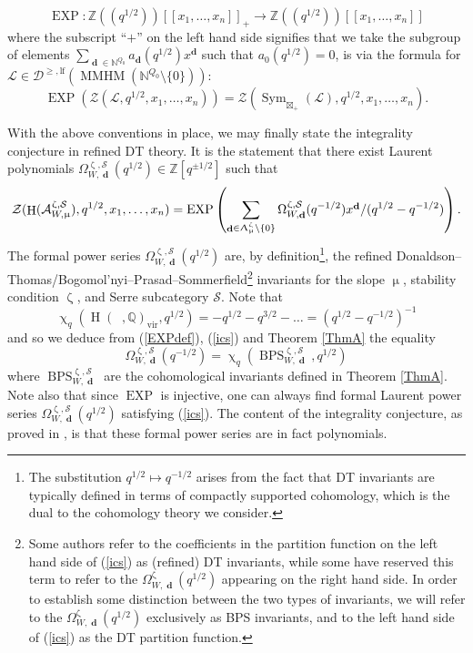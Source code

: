\documentclass[a4paper,10pt]{amsart}
\renewcommand{\zeta}{\upzeta}
\renewcommand{\chi}{\upchi}
\renewcommand{\Lambda}{\Uplambda}
\renewcommand{\mu}{\upmu}
\DeclareMathOperator{\BC}{B\mathbb{C}^*}
\DeclareMathOperator{\EXP}{EXP}
\newcommand{\SP}{\mathcal{S}}
\DeclareMathOperator{\MMHM}{MMHM}
\DeclareMathOperator{\dd}{\mathbf{d}}
\DeclareMathOperator{\DT}{BPS}
\DeclareMathOperator{\Sym}{Sym}
\DeclareMathOperator{\vir}{vir}
\DeclareMathOperator{\HO}{H}
\newcommand{\Dulf}{\mathcal{D}^{\geq, \mathrm{lf}}}
\begin{document}
\[
\EXP\colon\mathbb{Z}((q^{1/2}))[[x_1,\ldots,x_n]]_+\rightarrow\mathbb{Z}((q^{1/2}))[[x_1,\ldots,x_n]]
\]
where the subscript ``$+$'' on the left hand side signifies that we take the subgroup of elements $\sum_{\dd\in\mathbb{N}^{Q_0}}a_{\dd}(q^{1/2})x^{\dd}$ such that $a_0(q^{1/2})=0$, is via the formula for $\mathcal{L}\in\Dulf(\MMHM(\mathbb{N}^{Q_0}\setminus\{0\}))$:
\begin{equation}
\label{EXPdef}
\EXP\left(\mathcal{Z}(\mathcal{L},q^{1/2},x_1,\ldots,x_n)\right)=\mathcal{Z}\left(\Sym_{\boxtimes_+}(\mathcal{L}),q^{1/2},x_1,\ldots,x_n\right).
\end{equation}


With the above conventions in place, we may finally state the integrality conjecture in refined DT theory.  It is the statement that there exist Laurent polynomials $\Omega^{\zeta,\SP}_{W,\dd}(q^{1/2})\in\mathbb{Z}[q^{\pm 1/2}]$ such that 
\begin{equation}
\label{ics}
\mathcal{Z}(\HO(\mathcal{A}_{W,\mu}^{\zeta,\SP}),q^{1/2},x_1,\ldots,x_n)=\EXP\left(\sum_{\dd\in\Lambda_{\mu}^{\zeta}\setminus\{0\}} \Omega^{\zeta,\SP}_{W,\dd}(q^{-1/2})x^{\dd}/(q^{1/2}-q^{-1/2})\right).
\end{equation}
The formal power series $\Omega_{W,\dd}^{\zeta,\SP}(q^{1/2})$ are, by definition\footnote{The substitution $q^{1/2}\mapsto q^{-1/2}$ arises from the fact that DT invariants are typically defined in terms of compactly supported cohomology, which is the dual to the cohomology theory we consider.}, the refined Donaldson--Thomas/Bogomol'nyi--Prasad--Sommerfield\footnote{Some authors refer to the coefficients in the partition function on the left hand side of (\ref{ics}) as (refined) DT invariants, while some have reserved this term to refer to the $\Omega_{W,\dd}^{\zeta}(q^{1/2})$ appearing on the right hand side.  In order to establish some distinction between the two types of invariants, we will refer to the $\Omega_{W,\dd}^{\zeta}(q^{1/2})$ exclusively as BPS invariants, and to the left hand side of (\ref{ics}) as the DT partition function.} invariants for the slope $\mu$, stability condition $\zeta$, and Serre subcategory $\mathcal{S}$.  Note that 
\[
\chi_q(\HO(\BC,\mathbb{Q})_{\vir},q^{1/2})=-q^{1/2}-q^{3/2}-\ldots=(q^{1/2}-q^{-1/2})^{-1}
\]
and so we deduce from (\ref{EXPdef}), (\ref{ics}) and Theorem \ref{ThmA} the equality
\[
\Omega^{\zeta,\SP}_{W,\dd}(q^{-1/2})=\chi_q(\DT_{W,\dd}^{\zeta,\SP},q^{1/2})
\]
where $\DT_{W,\dd}^{\zeta,\SP}$ are the cohomological invariants defined in Theorem \ref{ThmA}.  Note also that since $\EXP$ is injective, one can always find formal Laurent power series $\Omega_{W,\dd}^{\zeta,\SP}(q^{1/2})$ satisfying (\ref{ics}).  The content of the integrality conjecture, as proved in \cite{KS2}, is that these formal power series are in fact polynomials.
\end{document}
